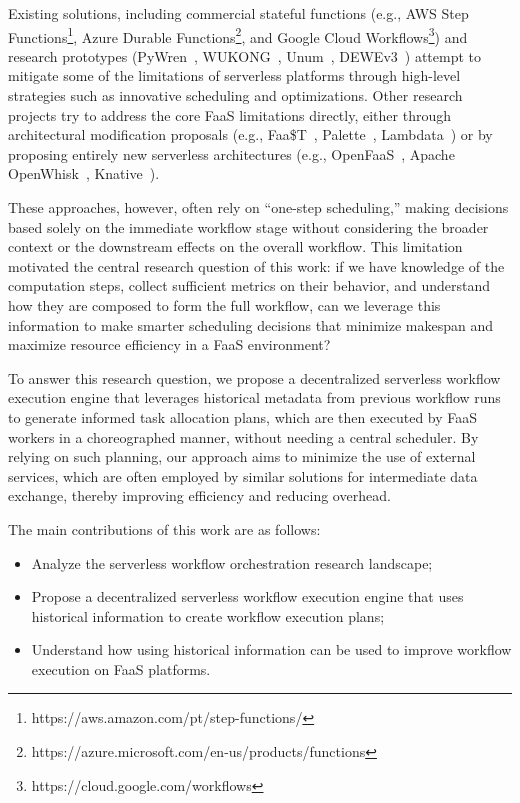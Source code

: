 \documentclass[conference]{IEEEtran}
\begin{document}
Existing solutions, including commercial stateful functions (e.g., AWS Step Functions\footnote{https://aws.amazon.com/pt/step-functions/}, Azure Durable Functions\footnote{https://azure.microsoft.com/en-us/products/functions}, and Google Cloud Workflows\footnote{https://cloud.google.com/workflows}) and research prototypes (PyWren~\cite{pywren}, WUKONG~\cite{wukong_2}, Unum~\cite{unum_decentralized_orchestrator}, DEWEv3~\cite{dewe_v3}) attempt to mitigate some of the limitations of serverless platforms through high-level strategies such as innovative scheduling and optimizations. Other research projects try to address the core FaaS limitations directly, either through architectural modification proposals (e.g., Faa\$T~\cite{faast_caching}, Palette~\cite{palette_load_balancing}, Lambdata~\cite{lambdata_intents}) or by proposing entirely new serverless architectures (e.g., OpenFaaS~\cite{openfaas}, Apache OpenWhisk~\cite{open_whisk}, Knative~\cite{knative}).

These approaches, however, often rely on “one-step scheduling,” making decisions based solely on the immediate workflow stage without considering the broader context or the downstream effects on the overall workflow. This limitation motivated the central research question of this work: if we have knowledge of the computation steps, collect sufficient metrics on their behavior, and understand how they are composed to form the full workflow, can we leverage this information to make smarter scheduling decisions that minimize makespan and maximize resource efficiency in a FaaS environment?

To answer this research question, we propose a decentralized serverless workflow execution engine that leverages historical metadata from previous workflow runs to generate informed task allocation plans, which are then executed by FaaS workers in a choreographed manner, without needing a central scheduler. By relying on such planning, our approach aims to minimize the use of external services, which are often employed by similar solutions for intermediate data exchange, thereby improving efficiency and reducing overhead.

The main contributions of this work are as follows:
\begin{itemize}
    \item Analyze the serverless workflow orchestration research landscape;
    \item Propose a decentralized serverless workflow execution engine that uses historical information to create workflow execution plans;
    \item Understand how using historical information can be used to improve workflow execution on FaaS platforms.
\end{itemize}
\end{document}
